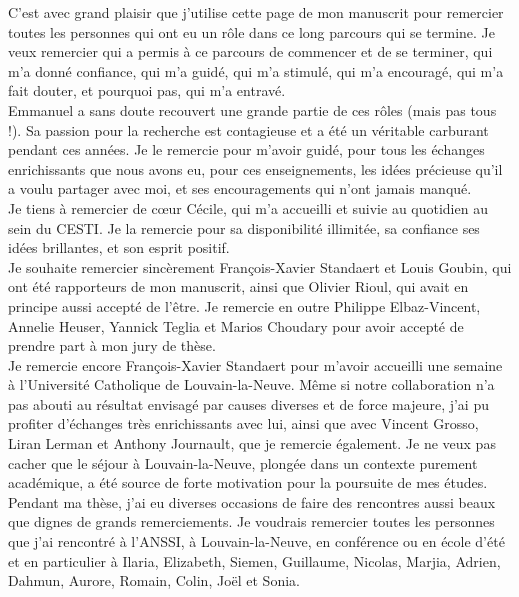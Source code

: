 C'est avec grand plaisir que j'utilise cette page de mon manuscrit pour remercier toutes les personnes qui ont eu un rôle dans ce long parcours qui se termine. Je veux remercier qui a permis à ce parcours de commencer et de se terminer, qui m'a donné confiance, qui m'a guidé, qui m'a stimulé, qui m'a encouragé, qui m'a fait douter, et pourquoi pas, qui m'a entravé. \\

Emmanuel a sans doute recouvert une grande partie de ces rôles (mais pas tous !). Sa passion pour la recherche est contagieuse et a été un véritable carburant pendant ces années. Je le remercie pour m'avoir guidé, pour tous les échanges enrichissants que nous avons eu, pour ces enseignements, les idées précieuse qu'il a voulu partager avec moi, et ses encouragements qui n'ont jamais manqué. \\

Je tiens à remercier de cœur Cécile, qui m'a accueilli et suivie au quotidien au sein du CESTI. Je la remercie pour sa disponibilité illimitée, sa confiance ses idées brillantes, et son esprit positif. \\

Je souhaite remercier sincèrement François-Xavier Standaert et Louis Goubin, qui ont été rapporteurs de mon manuscrit, ainsi que Olivier Rioul, qui avait en principe aussi accepté de l'être. Je remercie en outre Philippe Elbaz-Vincent, Annelie Heuser, Yannick Teglia et Marios Choudary pour avoir accepté de prendre part à mon jury de thèse. \\

Je remercie encore François-Xavier Standaert pour m'avoir accueilli une semaine à l'Université Catholique de Louvain-la-Neuve. Même si notre collaboration n'a pas abouti au résultat envisagé par causes diverses et de force majeure, j'ai pu profiter d'échanges très enrichissants avec lui, ainsi que avec Vincent Grosso, Liran Lerman et Anthony Journault, que je remercie également. Je ne veux pas cacher que le séjour à Louvain-la-Neuve, plongée dans un contexte purement académique, a été source de forte motivation pour la poursuite de mes études. \\

Pendant ma thèse, j'ai eu diverses occasions de faire des rencontres aussi beaux que dignes de grands remerciements. Je voudrais remercier toutes les personnes que j'ai rencontré à l'ANSSI, à Louvain-la-Neuve, en conférence ou en école d'été et en particulier à Ilaria, Elizabeth, Siemen, Guillaume, Nicolas, Marjia, Adrien, Dahmun, Aurore, Romain, Colin, Joël et Sonia.

